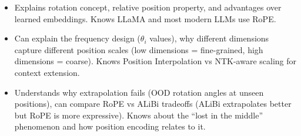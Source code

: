 \begin{interviewq}
\goodgreat
\begin{itemize}
    \item {} Explains rotation concept, relative position property, and advantages over learned embeddings. Knows LLaMA and most modern LLMs use RoPE.
    \item {} Can explain the frequency design ($\theta_i$ values), why different dimensions capture different position scales (low dimensions = fine-grained, high dimensions = coarse). Knows Position Interpolation vs NTK-aware scaling for context extension.
    \item {} Understands why extrapolation fails (OOD rotation angles at unseen positions), can compare RoPE vs ALiBi tradeoffs (ALiBi extrapolates better but RoPE is more expressive). Knows about the ``lost in the middle'' phenomenon and how position encoding relates to it.
\end{itemize}

\end{interviewq}

